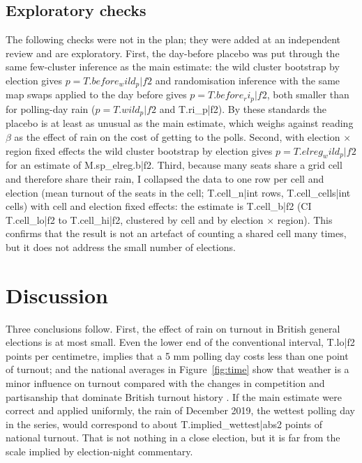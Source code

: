 \documentclass[11pt,a4paper]{article}
\begin{document}
\subsection{Exploratory checks}\label{sec:explore}
The following checks were not in the plan; they were added at an independent review and are exploratory. First, the day-before placebo was put through the same few-cluster inference as the main estimate: the wild cluster bootstrap by election gives $p={{T.before_wild_p|f2}}$ and randomisation inference with the same map swaps applied to the day before gives $p={{T.before_ri_p|f2}}$, both smaller than for polling-day rain ($p={{T.wild_p|f2}}$ and {{T.ri_p|f2}}). By these standards the placebo is at least as unusual as the main estimate, which weighs against reading $\beta$ as the effect of rain on the cost of getting to the polls. Second, with election $\times$ region fixed effects the wild cluster bootstrap by election gives $p={{T.elreg_wild_p|f2}}$ for an estimate of {{M.sp_elreg.b|f2}}. Third, because many seats share a grid cell and therefore share their rain, I collapsed the data to one row per cell and election (mean turnout of the seats in the cell; {{T.cell_n|int}} rows, {{T.cell_cells|int}} cells) with cell and election fixed effects: the estimate is {{T.cell_b|f2}} (CI {{T.cell_lo|f2}} to {{T.cell_hi|f2}}, clustered by cell and by election $\times$ region). This confirms that the result is not an artefact of counting a shared cell many times, but it does not address the small number of elections.

\section{Discussion}\label{sec:disc}
Three conclusions follow. First, the effect of rain on turnout in British general elections is at most small. Even the lower end of the conventional interval, {{T.lo|f2}} points per centimetre, implies that a 5 mm polling day costs less than one point of turnout; and the national averages in Figure~\ref{fig:time} show that weather is a minor influence on turnout compared with the changes in competition and partisanship that dominate British turnout history \citep{heath2007,franklin2004}. If the main estimate were correct and applied uniformly, the rain of December 2019, the wettest polling day in the series, would correspond to about {{T.implied_wettest|abs2}} points of national turnout. That is not nothing in a close election, but it is far from the scale implied by election-night commentary.
\end{document}
